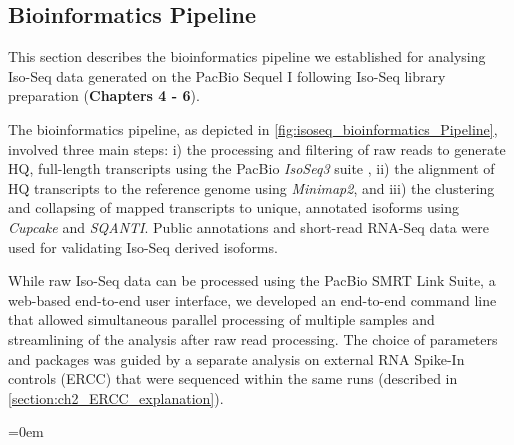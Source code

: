 \clearpage
\subsection{Bioinformatics Pipeline} 
\label{section:isoseq_bioinformatics}
This section describes the bioinformatics pipeline we established for analysing Iso-Seq data generated on the PacBio Sequel I following Iso-Seq library preparation (\textbf{Chapters 4 - 6}). 

The bioinformatics pipeline, as depicted in \cref{fig:isoseq_bioinformatics_Pipeline}, involved three main steps: i) the processing and filtering of raw reads to generate HQ, full-length transcripts using the PacBio \textit{IsoSeq3} suite \cite{Gordon2015}, ii) the alignment of HQ transcripts to the reference genome using \textit{Minimap2}\cite{Li2018}, and iii) the clustering and collapsing of mapped transcripts to unique, annotated isoforms using \textit{Cupcake}\cite{TsengCupcake} and \textit{SQANTI}\cite{Tardaguila2018}. Public annotations and short-read RNA-Seq data were used for validating Iso-Seq derived isoforms. 

While raw Iso-Seq data can be processed using the PacBio SMRT Link Suite, a web-based end-to-end user interface, we developed an end-to-end command line that allowed simultaneous parallel processing of multiple samples and streamlining of the analysis after raw read processing. The choice of parameters and packages was guided by a separate analysis on external RNA Spike-In controls (ERCC) that were sequenced within the same runs (described in \cref{section:ch2_ERCC_explanation}). 

\begingroup
\parindent=0em
\localtableofcontents 
\endgroup


